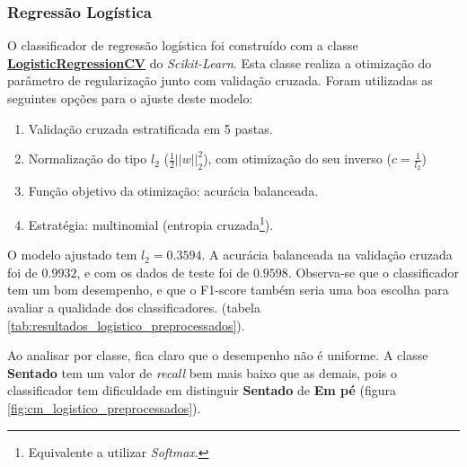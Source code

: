 \documentclass[final,5p]{elsarticle}
\numberwithin{equation}{section}
\begin{document}
    \subsubsection{Regressão Logística} \label{sec:logistica}

        O classificador de regressão logística foi construído com a classe \href{https://scikit-learn.org/stable/modules/generated/sklearn.linear_model.LogisticRegressionCV.html}{\textbf{LogisticRegressionCV}} do \emph{Scikit-Learn}. Esta classe realiza a otimização do parâmetro de regularização junto com validação cruzada. Foram utilizadas as seguintes opções para o ajuste deste modelo:

        \begin{enumerate}
            \item Validação cruzada estratificada em 5 pastas.
            \item Normalização do tipo $l_2$ ($\frac{1}{2} ||w||_2^2$), com otimização do seu inverso ($c = \frac{1}{l_2}$)
            \item Função objetivo da otimização: acurácia balanceada.
            \item Estratégia: multinomial (entropia cruzada\footnote{Equivalente a utilizar \emph{Softmax}.}).
        \end{enumerate}

        O modelo ajustado tem $l_2 = 0.3594$. A acurácia balanceada na validação cruzada foi de $0.9932$, e com os dados de teste foi de $0.9598$. Observa-se que o classificador tem um bom desempenho, e que o F1-score também seria uma boa escolha para avaliar a qualidade dos classificadores. (tabela \ref{tab:resultados_logistico_preprocessados}).

        Ao analisar por classe, fica claro que o desempenho não é uniforme. A classe \textbf{Sentado} tem um valor de \emph{recall} bem mais baixo que as demais, pois o classificador tem dificuldade em distinguir \textbf{Sentado} de \textbf{Em pé} (figura \ref{fig:cm_logistico_preprocessados}).
\end{document}
